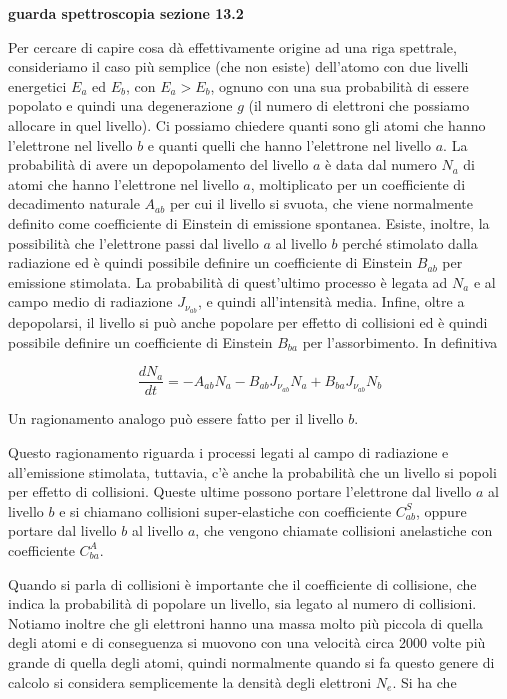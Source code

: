 \textbf{guarda spettroscopia sezione 13.2}

Per cercare di capire cosa dà effettivamente origine ad una riga spettrale, consideriamo il caso più semplice (che non esiste) dell'atomo con due livelli energetici $E_a$ ed $E_b$, con $E_a > E_b$, ognuno con una sua probabilità di essere popolato e quindi una degenerazione $g$ (il numero di elettroni che possiamo allocare in quel livello). Ci possiamo chiedere quanti sono gli atomi che hanno l'elettrone nel livello $b$ e quanti quelli che hanno l'elettrone nel livello $a$. La probabilità di avere un depopolamento del livello $a$ è data dal numero $N_a$ di atomi che hanno l'elettrone nel livello $a$, moltiplicato per un coefficiente di decadimento naturale $A_{ab}$ per cui il livello si svuota, che viene normalmente definito come coefficiente di Einstein di emissione spontanea. Esiste, inoltre, la possibilità che l'elettrone passi dal livello $a$ al livello $b$ perché stimolato dalla radiazione ed è quindi possibile definire un coefficiente di Einstein $B_{ab}$ per emissione stimolata. La probabilità di quest'ultimo processo è legata ad $N_a$ e al campo medio di radiazione $J_{\nu_{ab}}$, e quindi all'intensità media. Infine, oltre a depopolarsi, il livello si può anche popolare per effetto di collisioni ed è quindi possibile definire un coefficiente di Einstein $B_{ba}$ per l'assorbimento. In definitiva

$$\frac{dN_a}{dt}= -A_{ab} N_a - B_{ab} J_{\nu_{ab}}N_a + B_{ba} J_{\nu_{ab}}N_b$$

Un ragionamento analogo può essere fatto per il livello $b$.

Questo ragionamento riguarda i processi legati al campo di radiazione e all'emissione stimolata, tuttavia, c'è anche la probabilità che un livello si popoli per effetto di collisioni. Queste ultime possono portare l'elettrone dal livello $a$ al livello $b$ e si chiamano collisioni super-elastiche con coefficiente $C_{ab}^S$, oppure portare dal livello $b$ al livello $a$, che vengono chiamate collisioni anelastiche con coefficiente $C_{ba}^A$.

Quando si parla di collisioni è importante che il coefficiente di collisione, che indica la probabilità di popolare un livello, sia legato al numero di collisioni. Notiamo inoltre che gli elettroni hanno una massa molto più piccola di quella degli atomi e di conseguenza si muovono con una velocità circa 2000 volte più grande di quella degli atomi, quindi normalmente quando si fa questo genere di calcolo si considera semplicemente la densità degli elettroni $N_e$. Si ha che

